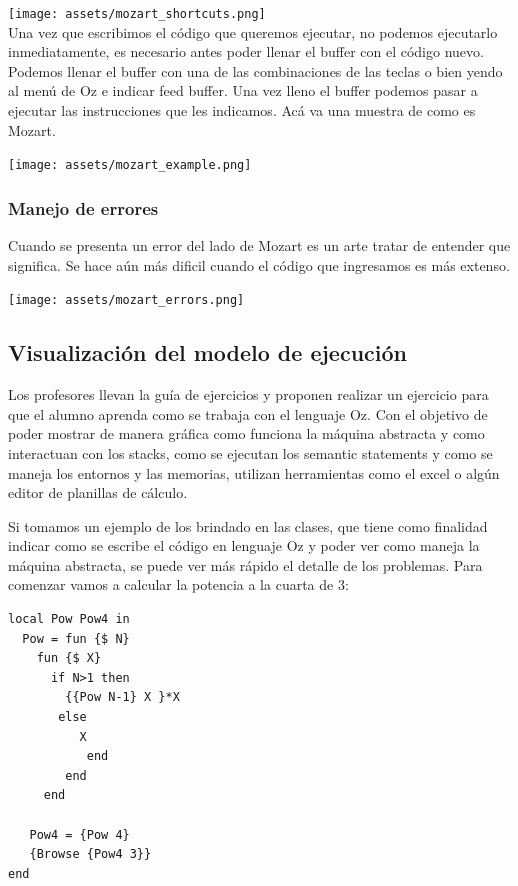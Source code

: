 \documentclass[a4paper,11pt]{article}
\begin{document}
\texttt{[image: assets/mozart\_shortcuts.png]}\\[1cm]

Una vez que escribimos el código que queremos ejecutar, no podemos ejecutarlo inmediatamente, es necesario antes poder llenar el buffer con el código nuevo. Podemos llenar el buffer con una de las combinaciones de las teclas o bien yendo al menú de Oz e indicar feed buffer. Una vez lleno el buffer podemos pasar a ejecutar las instrucciones que les indicamos.
Acá va una muestra de como es Mozart.

\texttt{[image: assets/mozart\_example.png]}\\[1cm]

\subsubsection{Manejo de errores}

Cuando se presenta un error del lado de Mozart es un arte tratar de entender que significa. Se hace aún más dificil cuando el código que ingresamos es más extenso.

\texttt{[image: assets/mozart\_errors.png]}\\[1cm]

\subsection{Visualización del modelo de ejecución}

Los profesores llevan la guía de ejercicios y proponen realizar un ejercicio para que el alumno aprenda como se trabaja con el lenguaje Oz. Con el objetivo de poder mostrar de manera gráfica como funciona la máquina abstracta y como interactuan con los stacks, como se ejecutan los semantic statements y como se maneja los entornos y las memorias, utilizan herramientas como el excel o algún editor de planillas de cálculo.

Si tomamos un ejemplo de los brindado en las clases, que tiene como finalidad indicar como se escribe el código en lenguaje Oz y poder ver como maneja la máquina abstracta, se puede ver más rápido el detalle de los problemas.
Para comenzar vamos a calcular la potencia a la cuarta de 3:

\begin{lstlisting}[language=oz]
local Pow Pow4 in
  Pow = fun {$ N}
	fun {$ X}
	  if N>1 then
        {{Pow N-1} X }*X
	   else
		  X
	       end
	    end
	 end

   Pow4 = {Pow 4}
   {Browse {Pow4 3}}
end
\end{lstlisting}
\end{document}
